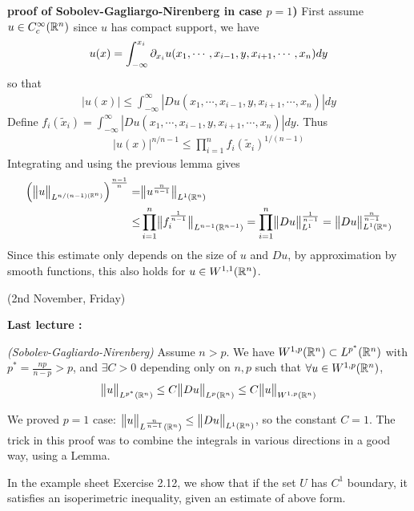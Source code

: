 \documentclass[12pt,a4paper]{report}
\newenvironment{proof}
{\begin{changemargin}{1cm}{0.5cm} 
	}%
	{\end{changemargin}
}
\begin{document}
\begin{proof}
\textbf{proof of Sobolev-Gagliargo-Nirenberg in case $p=1$)} First assume $u\in C_c^{\infty}(\mathbb{R}^n)$ since $u$ has compact support, we have
\begin{align*}
u(x) = \int_{-\infty}^{x_i} \partial_{x_i} u(x_1, \cdots, x_{i-1}, y, x_{i+1}, \cdots, x_n) dy
\end{align*}
so that
\begin{align*}
|u(x)| \leq \int_{-\infty}^{\infty} |Du(x_1, \cdots, x_{i-1},y,x_{i+1},\cdots, x_n)| dy
\end{align*}
Define $f_i(\tilde{x}_i)  = \int_{-\infty}^{\infty} |Du(x_1, \cdots, x_{i-1},y,x_{i+1},\cdots, x_n)| dy$. Thus
\begin{align*}
|u(x)|^{n/n-1} \leq \prod_{i=1}^n f_i(\tilde{x}_i)^{1/(n-1)}
\end{align*}
Integrating and using the previous lemma gives
\begin{align*}
\Big( \bigl\lVert u\bigr\rVert_{L^{n/(n-1)(\mathbb{R}^n)}}  \Big)^{\frac{n-1}{n}} =& \bigl\lVert u^{\frac{n}{n-1}}\bigr\rVert_{L^1(\mathbb{R}^n)}  \\
\leq& \prod_{i=1}^n \bigl\lVert f_i^{\frac{1}{n-1}}\bigr\rVert_{L^{n-1}(\mathbb{R}^{n-1})} = \prod_{i=1}^n \bigl\lVert Du\bigr\rVert_{L^1}^{\frac{1}{n-1}} = \bigl\lVert Du\bigr\rVert_{L^1(\mathbb{R}^n)}^{\frac{n}{n-1}}
\end{align*}
Since this estimate only depends on the size of $u$ and $Du$, by approximation by smooth functions, this also holds for $u\in W^{1,1}(\mathbb{R}^n)$.

\eop
\end{proof}
\s

\newday

(2nd November, Friday)
\s

\textbf{Last lecture :}

\thm \emph{(Sobolev-Gagliardo-Nirenberg)} Assume $n>p$. We have $W^{1,p}(\mathbb{R}^n) \subset L^{p^*} (\mathbb{R}^n)$ with $p^* = \frac{np}{n-p}>p$, and $\exists C >0$ depending only on $n,p$ such that $\forall u \in W^{1,p}(\mathbb{R}^n)$,
\begin{align*}
\bigl\lVert u\bigr\rVert_{L^{p^*}(\mathbb{R}^n)} \leq C \bigl\lVert Du\bigr\rVert_{L^p(\mathbb{R}^n)} \leq C\bigl\lVert u\bigr\rVert_{W^{1,p}(\mathbb{R}^n)}
\end{align*}
\s

We proved $p=1$ case: $\bigl\lVert u\bigr\rVert_{L^{\frac{n}{n-1}}(\mathbb{R}^n)} \leq \bigl\lVert Du\bigr\rVert_{L^1(\mathbb{R}^n)}$, so the constant $C =1$. The trick in this proof was to combine the integrals in various directions in a good way, using a Lemma.

In the example sheet Exercise 2.12, we show that if the set $U$ has $C^1$ boundary, it satisfies an isoperimetric inequality, given an estimate of above form.
\s
\end{document}
